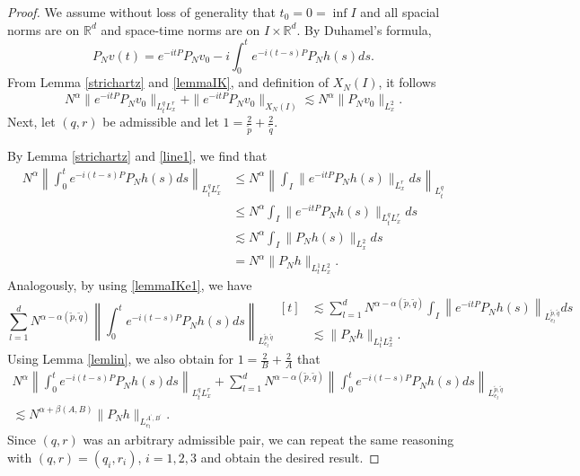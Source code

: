 \documentclass[aihp]{imsart}
\numberwithin{equation}{section}
\theoremstyle{plain}
\theoremstyle{remark}
\newcommand{\R}{\mathbb{R}}
\begin{document}
\begin{proof}
We assume without loss of generality that $t_0 = 0=\inf I$ and all spacial norms are on $\R^d$ and space-time norms are on $I \times \R^d$. By Duhamel's formula,
$$P_N v(t)= e^{-it P}P_N v_0 - i \int_0^t e^{-i(t-s) P} P_N h(s) ds. $$
From Lemma \ref{strichartz} and \ref{lemmaIK}, and definition of $X_N(I)$, it follows
$$N^\alpha \|e^{-it P} P_N v_0 \|_{L_t^q L_x^r } + \|e^{-it P} P_N v_0 \|_{X_N (I)} \lesssim N^\alpha \|P_N v_0\|_{L_x^2}.$$
Next, let $(q, r)$ be  admissible and let $1= \frac{2}{\tilde{p}} +\frac{2}{\tilde{q}}$. 


By Lemma \ref{strichartz} and \eqref{line1}, we find that 
\begin{align*}
N^\alpha  \left\|\int_0^t e^{-i(t-s) P} P_N h(s) ds\right\|_{L_t^q L_x^r } 
 &\leq N^\alpha  \left\|\int_I \|e^{- i t P} P_N h(s)\|_{L_x^r} ds\right\|_{L_t^q} 
 \\
 &\leq N^\alpha  
\int_I \|e^{- i t P} P_N h(s)\|_{L_t^qL_x^r} ds
\\
& \lesssim N^\alpha \int_I \|P_N h(s)\|_{L^2_x} ds \\
&= N^\alpha  \|P_N h\|_{L^1_tL^2_x}.
\end{align*}
Analogously, by using \eqref{lemmaIKe1}, we have
\begin{equation*}
\sum_{l=1}^d N^{\alpha -\alpha (\tilde{p},\tilde q)} \left\|\int_0^t e^{-i(t-s) P} P_N h(s) ds\right\|_{L_{e_l}^{\tilde{p},\tilde q}  }
\begin{aligned}[t]
 & \lesssim 
 \sum_{l=1}^d N^{\alpha -\alpha (\tilde{p},\tilde q)} \int_I \left\| e^{-it P} P_N h(s) \right\|_{L_{e_l}^{\tilde{p},\tilde q}  } ds \\
 &\lesssim \|P_N h\|_{L^1_tL^2_x}.
\end{aligned}
\end{equation*}
Using Lemma \ref{lemlin}, we also obtain for $1= \frac{2}{B} +\frac{2}{A}$ that
\begin{multline*}
N^\alpha  \left\|\int_0^t e^{-i(t-s) P} P_N h(s) ds\right\|_{L_t^q L_x^r} + \sum_{l=1}^d N^{\alpha -\alpha (\tilde{p},\tilde q )}   
\left\|\int_0^t e^{-i(t-s) P} P_N h(s) ds\right\|_{L_{e_l}^{\tilde{p},\tilde q}  }\\
 \lesssim N^{\alpha +\beta (A,B)}  \|P_N h\|_{L_{e_l}^{A^\prime ,B^\prime} } .
\end{multline*}
Since $(q, r)$ was an arbitrary admissible pair, we can repeat the same reasoning with $(q, r) = (q_i, r_i)$, $i = 1, 2, 3$ and obtain the desired result.
\end{proof}
\end{document}
